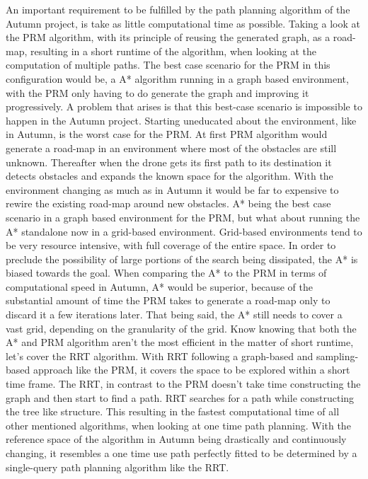 An important requirement to be fulfilled by the path planning algorithm of the Autumn project, is take as little computational time as possible. Taking a look at the PRM algorithm, with its principle of reusing the generated graph, as a road-map, resulting in a short runtime of the algorithm, when looking at the computation of multiple paths. The best case scenario for the PRM in this configuration would be, a A* algorithm running in a graph based environment, with the PRM only having to do generate the graph and improving it progressively. A problem that arises is that this best-case scenario is impossible to happen in the Autumn project. Starting uneducated about the environment, like in Autumn, is the worst case for the PRM. At first PRM algorithm would generate a road-map in an environment where most of the obstacles are still unknown. Thereafter when the drone gets its first path to its destination it detects obstacles and expands the known space for the algorithm. With the environment changing as much as in Autumn it would be far to expensive to rewire the existing road-map around new obstacles. A* being the best case scenario in a graph based environment for the PRM, but what about running the A* standalone now in a grid-based environment. Grid-based environments tend to be very resource intensive, with full coverage of the entire space. In order to preclude the possibility of large portions of the search being dissipated, the A* is biased towards the goal. When comparing the A* to the PRM in terms of computational speed in Autumn, A* would be superior, because of the substantial amount of time the PRM takes to generate a road-map only to discard it a few iterations later. That being said, the A* still needs to cover a vast grid, depending on the granularity of the grid. Know knowing that both the A* and PRM algorithm aren't the most efficient in the matter of short runtime, let's cover the RRT algorithm. With RRT following a graph-based and sampling-based approach like the PRM, it covers the space to be explored within a short time frame. The RRT, in contrast to the PRM doesn't take time constructing the graph and then start to find a path. RRT searches for a path while constructing the tree like structure. This resulting in the fastest computational time of all other mentioned algorithms, when looking at one time path planning. With the reference space of the algorithm in Autumn being drastically and continuously changing, it resembles a one time use path perfectly fitted to be determined by a single-query path planning algorithm like the RRT.


